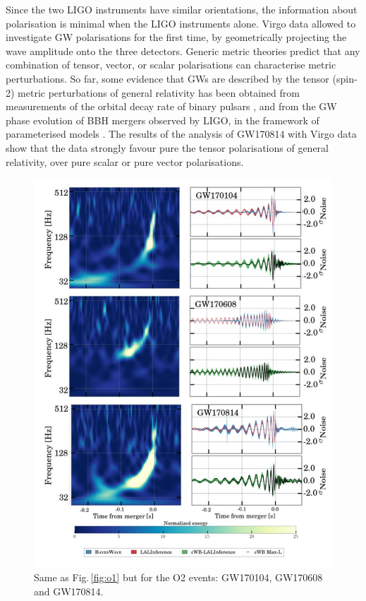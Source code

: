 \documentclass[binding=0.6cm, LaM]{sapthesis}
\begin{document}
	Since the two LIGO instruments have similar orientations, 
	the information about polarisation is minimal when the LIGO instruments alone.
	Virgo data allowed to investigate GW polarisations for the first time, by geometrically 
	projecting the wave amplitude onto the three detectors.
	Generic metric theories predict that any combination of tensor, vector, or scalar 
	polarisations \cite{85} can characterise metric perturbations.
	So far, some evidence that GWs are described by the tensor (spin-2) metric perturbations 
	of general relativity has been obtained from measurements of the orbital decay rate of binary pulsars \cite{135,140}, 
	and from the GW phase evolution of BBH mergers observed by LIGO, in the framework of parameterised models \cite{14,52,60}. 
	The results of the analysis of GW170814 with Virgo data show that the data strongly favour
	pure the tensor polarisations of general relativity, over pure scalar or pure vector polarisations.

        \begin{figure}[!t]
          \label{o2}
          \includegraphics[scale=0.45]{o2}
          \centering
          \caption{Same as Fig.\,\ref{fig:o1} but for the O2 events: GW170104, GW170608 and GW170814.}
          \label{fig:o2}
        \end{figure}
\end{document}
